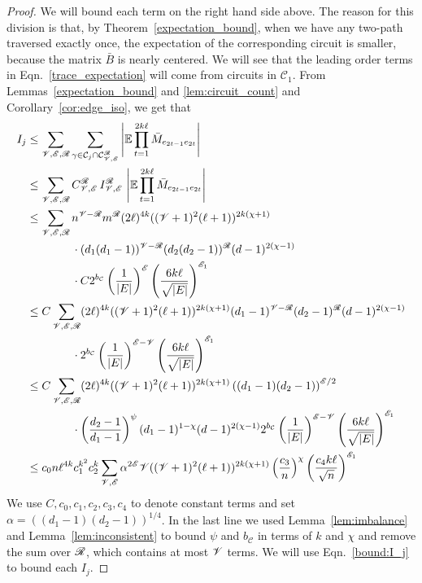 \begin{proof}
We will bound each term on the right hand side above.
The reason for this division is that, 
by Theorem~\ref{expectation_bound}, 
when we have any two-path traversed exactly once,
the expectation of the corresponding circuit is smaller,
because the matrix $\bar{B}$ is nearly centered.
We will see that the leading order terms in Eqn.~\eqref{trace_expectation} 
will come from circuits in $\mathcal{C}_1$. 
From Lemmas~\ref{expectation_bound} and
\ref{lem:circuit_count} and Corollary~\ref{cor:edge_iso}, we get that
\begin{align}
\nonumber
I_j
&\leq
\sum_{\nvertex,\nedge,\nvright}
\sum_{\gamma\in \mathcal{C}_j \cap \mathcal{C}_{\nvertex,\nedge}^\nvright} 
\left|
\mathbb{E} 
\prod_{t=1}^{2k\ell} \bar{M}_{e_{2t-1} e_{2t}}
\right|
\\
&\leq
\sum_{\nvertex,\nedge,\nvright}
C_{\nvertex,\nedge}^\nvright \,     
I_{\nvertex, \nedge}^\nvright \,
\left|
\mathbb{E} 
\prod_{t=1}^{2k\ell} \bar{M}_{e_{2t-1} e_{2t}}
\right|
\nonumber
\\
&\leq
\sum_{\nvertex,\nedge,\nvright}
n^{\nvertex - \nvright}
m^{\nvright}
(2\ell)^{4k} ((\nvertex + 1)^2 (\ell + 1))^{2k(\chi + 1)} \nonumber \\
& \qquad\qquad
\cdot
(d_1 (d_1 - 1))^{\nvertex - \nvright}
(d_2 (d_2 - 1))^\nvright
(d - 1)^{2(\chi - 1)} \nonumber \\
& \qquad\qquad
\cdot 
C
2^{b_\mathcal{C}} \left( \frac{1}{|E|} \right)^\nedge
\left( \frac{6 k \ell}{\sqrt{|E|}} \right)^{\nedge_1} \nonumber \\
&\leq
C
\sum_{\nvertex,\nedge,\nvright}
(2\ell)^{4k} ((\nvertex + 1)^2 (\ell + 1))^{2k(\chi + 1)}
(d_1 - 1)^{\nvertex - \nvright}
(d_2 - 1)^\nvright
(d - 1)^{2(\chi - 1)} \nonumber \\
& \qquad\qquad
\cdot 
2^{b_\mathcal{C}} 
\left( \frac{1}{|E|} \right)^{\nedge - \nvertex}
\left( \frac{6 k \ell}{\sqrt{|E|}} \right)^{\nedge_1} \nonumber \\
&\leq
C
\sum_{\nvertex,\nedge,\nvright}
(2\ell)^{4k} ((\nvertex + 1)^2 (\ell + 1))^{2k(\chi + 1)}
\left( (d_1 - 1)(d_2 - 1) \right)^{\nedge / 2}
\nonumber \\
& \qquad\qquad
\cdot
\left( \frac{d_2 - 1}{d_1 - 1} \right)^\psi
(d_1 - 1)^{1-\chi}
(d - 1)^{2(\chi - 1)}
2^{b_\mathcal{C}}
\left( \frac{1}{|E|} \right)^{\nedge - \nvertex}
\left( \frac{6 k \ell}{\sqrt{|E|}} \right)^{\nedge_1} 
\nonumber \\
&\leq
c_0 n
\ell^{4k} 
c_1^{k^2}
c_2^k
\sum_{\nvertex,\nedge}
\alpha^{2\nedge}
\nvertex
((\nvertex + 1)^2 (\ell + 1))^{2k(\chi + 1)}
\left( \frac{c_3}{n} \right)^\chi
\left( \frac{c_4 k \ell}{\sqrt{n}} \right)^{\nedge_1} 
\label{bound:I_j}
\end{align}
We use $C, c_0, c_1, c_2, c_3, c_4$ to denote constant terms
and set $\alpha = ((d_1-1)(d_2-1))^{1/4}$.
In the last line we used Lemma~\ref{lem:imbalance}
and Lemma~\ref{lem:inconsistent}
to bound 
$\psi$ and $b_\mathcal{C}$ 
in terms of 
$k$ and $\chi$
and remove the sum over $\mathscr{R}$,
which contains at most $\mathscr{V}$ terms.
We will use Eqn.~\ref{bound:I_j} to bound each $I_j$. 


\end{proof}
